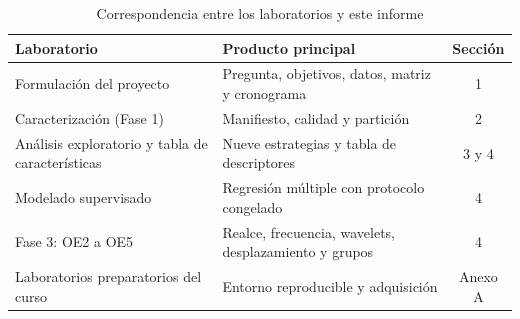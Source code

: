 \begin{table}[H]
\centering
\small
\caption{Correspondencia entre los laboratorios y este informe}
\begin{tabular}{@{}p{5.2cm}p{6.4cm}c@{}}
\toprule
\textbf{Laboratorio} & \textbf{Producto principal} & \textbf{Sección} \\
\midrule
Formulación del proyecto & Pregunta, objetivos, datos, matriz y cronograma & 1 \\
Caracterización (Fase 1) & Manifiesto, calidad y partición & 2 \\
Análisis exploratorio y tabla de características & Nueve estrategias y tabla de
descriptores & 3 y 4 \\
Modelado supervisado & Regresión múltiple con protocolo congelado & 4 \\
Fase 3: OE2 a OE5 & Realce, frecuencia, wavelets, desplazamiento y grupos & 4 \\
Laboratorios preparatorios del curso & Entorno reproducible y adquisición & Anexo A \\
\bottomrule
\end{tabular}
\end{table}